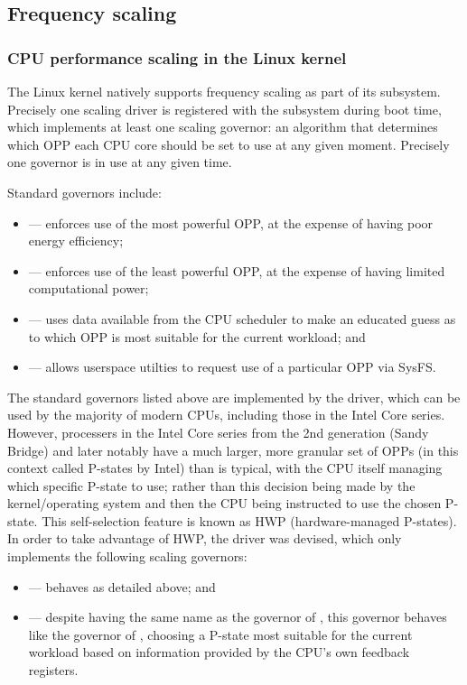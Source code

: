 \subsection{Frequency scaling}

\subsubsection{CPU performance scaling in the Linux kernel}

The Linux kernel natively supports frequency scaling as part of its 
subsystem.\cite{linuxCPUScaling} Precisely one scaling driver is registered with
the subsystem during boot time, which implements at least one scaling governor:
an algorithm that determines which OPP each CPU core should be set to use at
any given moment. Precisely one governor is in use at any given time.

Standard governors include:
\begin{itemize}
    \item {} — enforces use of the most powerful OPP, at the expense
        of having poor energy efficiency;
    \item {} — enforces use of the least powerful OPP, at the expense of
        having limited computational power;
    \item {} — uses data available from the CPU scheduler to make an
        educated guess as to which OPP is most suitable for the current
        workload; and
    \item {} — allows userspace utilties to request use of a
        particular OPP via SysFS.
\end{itemize}

The standard governors listed above are implemented by the 
driver, which can be used by the majority of modern CPUs, including those in
the Intel Core series. However, processers in the Intel Core series from the
2nd generation (Sandy Bridge) and later notably have a much larger, more
granular set of OPPs (in this context called P-states by Intel) than is
typical,\cite{intelDevManual} with the CPU itself managing which specific
P-state to use; rather than this decision being made by the kernel/operating
system and then the CPU being instructed to use the chosen P-state.
This self-selection feature is known as HWP (hardware-managed P-states).
In order to take advantage of HWP, the  driver was
devised,\cite{linuxIntelPState} which only implements the following scaling
governors:
\begin{itemize}
    \item {} — behaves as detailed above; and
    \item {} — despite having the same name as the 
        governor of , this governor behaves like the 
        governor of , choosing a P-state most suitable for the
        current workload based on information provided by the CPU's own
        feedback registers.
\end{itemize}

